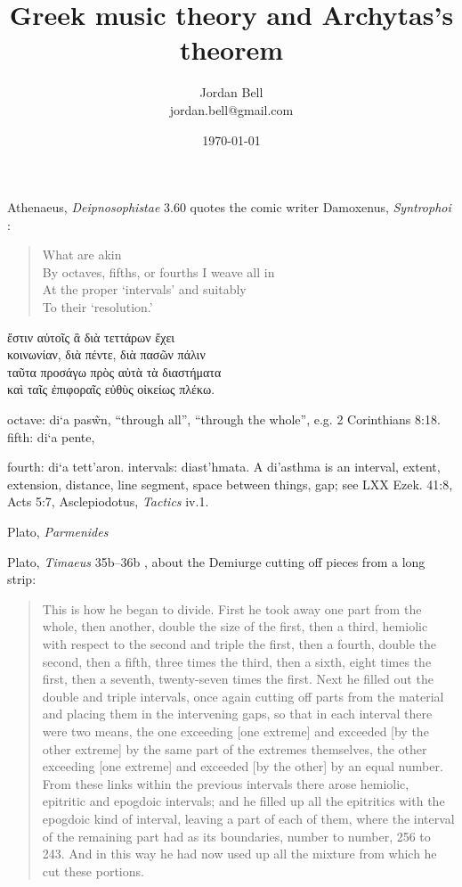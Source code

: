 \documentclass{article}
\newcommand{\textgreek}[1]{\begingroup\fontencoding{LGR}\selectfont#1\endgroup}
\theoremstyle{definition}
\begin{document}
\title{Greek music theory and Archytas's theorem}
\author{Jordan Bell\\
jordan.bell@gmail.com}
\date{\today}

\maketitle

Athenaeus, {\em Deipnosophistae} 3.60 quotes the comic writer Damoxenus, {\em Syntrophoi} \cite[p.~215]{edmonds}:

\begin{quote}
What are akin\\
By octaves, fifths, or fourths I weave all in\\
At the proper `intervals' and suitably\\
To their `resolution.'
\end{quote}

\textgreek{ἔστιν αὑτοῖς ἃ διὰ τεττάρων ἔχει\\
κοινωνίαν, διὰ πέντε, διὰ πασῶν πάλιν\\
ταῦτα προσάγω πρὸς αὐτὰ τὰ διαστήματα\\
καὶ ταῖς ἐπιφοραῖς εὐθὺς οἰκείως πλέκω.}


octave: \textgreek{di`a pas\~wn},  ``through all'', ``through the whole'', e.g. 2 Corinthians 8:18. fifth: \textgreek{di`a pente},

fourth: \textgreek{di`a tett'aron}. intervals:
\textgreek{diast'hmata}. A \textgreek{di'asthma} is an interval, extent, extension, distance, line segment, space between things, gap; see LXX Ezek. 41:8, Acts 5:7,
Asclepiodotus, {\em Tactics} iv.1.

Plato, {\em Parmenides} \cite[p.~38]{allen}

Plato, {\em Timaeus} 35b--36b \cite[pp.~59--60]{barker}, about the Demiurge cutting off pieces from a long strip:

\begin{quote}
This is how he began to divide. First he took away one part from the
whole, then another, double the size of the first, then a third, hemiolic with
respect to the second and triple the first, then a fourth, double the second, then
a fifth, three times the third, then a sixth, eight times the first, then a seventh,
twenty-seven times the first. Next he filled out the double and triple intervals,
once again cutting off parts from the material and placing them in the
intervening gaps, so that in each interval there were two means, the one
exceeding [one extreme] and exceeded [by the other extreme] by the same part
of the extremes themselves, the other exceeding [one extreme] and exceeded [by
the other] by an equal number. From these links within the previous intervals
there arose hemiolic, epitritic and epogdoic intervals; and he filled up all the
epitritics with the epogdoic kind of interval, leaving a part of each of them,
where the interval of the remaining part had as its boundaries, number to
number, 256 to 243. And in this way he had now used up all the mixture from
which he cut these portions.
\end{quote}
\end{document}
